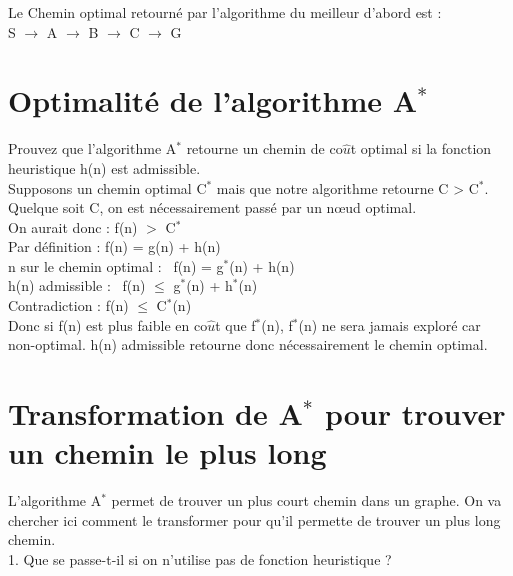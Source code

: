 \documentclass[12pt,a4paper, france]{article}
\newcommand\tab[1][1cm]{\hspace*{#1}}
\begin{document}
Le Chemin optimal retourn\'e par l\textquoteright algorithme du meilleur d\textquoteright abord est : \\
\tab \tab \tab S ${\rightarrow}$ A ${\rightarrow}$ B ${\rightarrow}$ C ${\rightarrow}$ G\\

\section{Optimalit\'e de l\textquoteright algorithme A${^*}$}

Prouvez que l\textquoteright algorithme A${^*}$ retourne un chemin de co${\hat{u}}$t optimal si la fonction heuristique h(n) est admissible. \\

Supposons un chemin optimal C${^*}$ mais que notre algorithme retourne C > C${^*}$. Quelque soit C, on est n\'ecessairement pass\'e par un nœud optimal. \\

\tab \tab On aurait donc : \tab \tab  \;  \;  \; f(n) ${>}$ C${^*}$ \\
\tab \tab \tab Par d\'efinition : \tab \tab \tab f(n) = g(n) + h(n) \\
\tab \tab \tab n sur le chemin optimal : \tab \, f(n) = g${^*}$(n) + h(n) \\
\tab \tab \tab h(n) admissible :  \tab \tab \; \; \, f(n) ${\le}$ g${^*}$(n) + h${^*}$(n) \\
\tab \tab \tab Contradiction : \tab \tab \tab f(n) ${\le}$ C${^*}$(n) \\

Donc si f(n) est plus faible en co${\hat{u}}$t que f${^*}$(n), f${^*}$(n) ne sera jamais explor\'e car non-optimal. h(n) admissible retourne donc n\'ecessairement le chemin optimal.

\section{Transformation de A${^*}$ pour trouver un chemin le plus long}

L\textquoteright algorithme A${^*}$  permet de trouver un plus court chemin dans un graphe. On va chercher ici comment le transformer pour qu\textquoteright il permette de trouver un plus long chemin. \\

1. Que se passe-t-il si on n\textquoteright utilise pas de fonction heuristique ? \\
\end{document}
